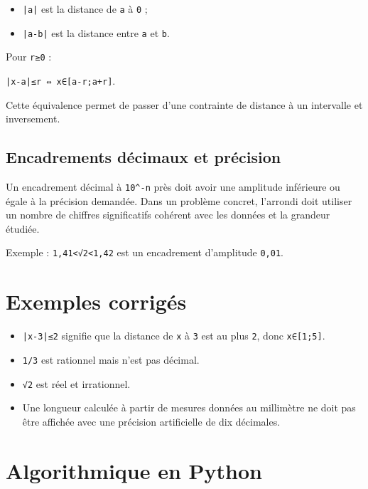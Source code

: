 \begin{itemize}
\item \texttt{|a|} est la distance de \texttt{a} à \texttt{0} ;
\item \texttt{|a-b|} est la distance entre \texttt{a} et \texttt{b}.
\end{itemize}

Pour \texttt{r≥0} :

\texttt{|x-a|≤r ⇔ x∈[a-r;a+r]}.

Cette équivalence permet de passer d'une contrainte de distance à un intervalle et inversement.

\subsection{Encadrements décimaux et précision}

Un encadrement décimal à \texttt{10^-n} près doit avoir une amplitude inférieure ou égale à la précision demandée. Dans un problème concret, l'arrondi doit utiliser un nombre de chiffres significatifs cohérent avec les données et la grandeur étudiée.

Exemple : \texttt{1,41<√2<1,42} est un encadrement d'amplitude \texttt{0,01}.

\section{Exemples corrigés}

\begin{itemize}
\item \texttt{|x-3|≤2} signifie que la distance de \texttt{x} à \texttt{3} est au plus \texttt{2}, donc \texttt{x∈[1;5]}.
\item \texttt{1/3} est rationnel mais n'est pas décimal.
\item \texttt{√2} est réel et irrationnel.
\item Une longueur calculée à partir de mesures données au millimètre ne doit pas être affichée avec une précision artificielle de dix décimales.
\end{itemize}


\section{Algorithmique en Python}

